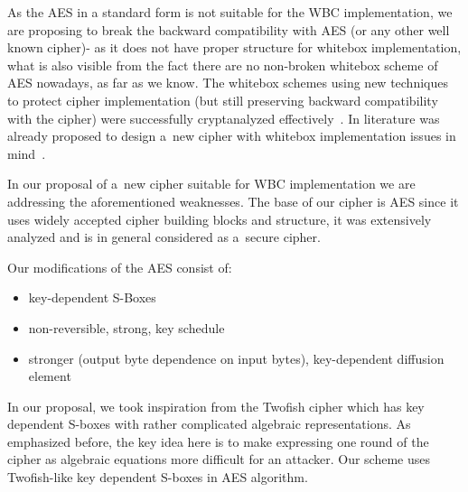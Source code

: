 \documentclass[11pt,oneside,final]{fithesis2}
\begin{document}
    As the AES in a standard form is not suitable for the WBC implementation, we are proposing to break the backward compatibility with AES (or any other well known cipher)- as it does not have proper structure for whitebox implementation, what is 
    also visible from the fact there are no non-broken whitebox scheme of AES nowadays, as far as we know. The whitebox schemes using new techniques to protect cipher implementation
    (but still preserving backward compatibility with the cipher) were successfully cryptanalyzed effectively~\citep{Billet:2004:CWB:2080787.2080809, Michiels:2007:MST:1314276.1314291, conf/indocrypt/MulderWP10, conf/sacrypt/MulderRP12}.    
    In literature was already proposed to design a~new cipher with whitebox implementation issues in mind~\citep{Billet:2004:CWB:2080787.2080809, wyseurPhd}. 
    
    In our proposal of a~new cipher suitable for WBC implementation we are addressing the aforementioned weaknesses. The base of our cipher is AES since it uses widely accepted
    cipher building blocks and structure, it was extensively analyzed and is in general considered as a~secure cipher.
	
    Our modifications of the AES consist of:
    \begin{itemize}
     \item key-dependent S-Boxes
     \item non-reversible, strong, key schedule
     \item stronger (output byte dependence on input bytes), key-dependent diffusion element
    \end{itemize}

    In our proposal, we took inspiration from the Twofish \cite{Schneier98twofish:a} cipher which has key dependent S-boxes with rather
    complicated algebraic representations. As emphasized before, the key idea here is to make expressing one round of the cipher as algebraic equations
    more difficult for an attacker. Our scheme uses Twofish-like key dependent S-boxes in AES algorithm. 
\end{document}
